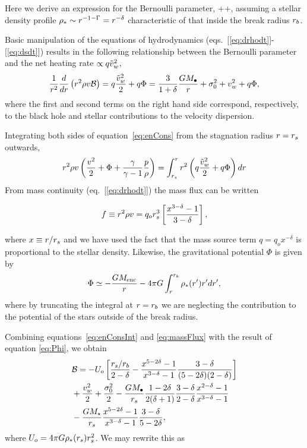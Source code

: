 Here we derive an expression for the Bernoulli parameter, \be
{} \equiv \ke +\gammaf {}+\Phi, \ee assuming a
stellar density profile $\rho_*\sim r^{-1-\Gamma}=r^{-\delta}$
characteristic of that inside the break radius $r_b$.

Basic manipulation of the equations of hydrodynamics
(eqs.~[\ref{eq:drhodt}]-[\ref{eq:dsdt}]) results in the following
relationship between the Bernoulli parameter and the net heating rate
$\propto q \tilde{v}_{w}^{2}$,
\begin{align}
\frac{1}{r^2} \frac{d}{dr} \left(r^2 \rho v \mathcal{B} \right) = q \frac{\tilde{v}_{w}^2}{2} + q \Phi = \frac{3}{1+\delta}\frac{G
  M_{\bullet}}{r}+\sigma_0^2+v_w^2 + q \Phi,
\label{eq:enCons}
\end{align}
where the first and second terms on the right hand side correspond,
respectively, to the black hole and stellar contributions to the
velocity dispersion.

Integrating both sides of equation~\eqref{eq:enCons} from the
stagnation radius $r = r_s$ outwards,
\begin{align}
  r^2 \rho v \left(\frac{v^2}{2}+\Phi+\frac{\gamma}{\gamma-1} \frac{p}{\rho} \right)= \int_{r_s}^{r}
    r^2 \left(q \frac{\tilde{v}_{w}^2}{2} + q\Phi\right) dr
    \label{eq:enConsInt}
\end{align}
From mass continuity (eq.~[\ref{eq:drhodt}]) the mass flux can be
written

\begin{equation}
 f\equiv r^2 \rho v = q_o r_s^3 \left[\frac{x^{3-\delta}-1}{3-\delta}\right],
 \label{eq:massFlux}
 \end{equation}

where $x \equiv r/r_s$ and we have used the fact that the mass
 source term $q = q_o x^{-\delta}$ is proportional to the stellar
 density.  Likewise, the gravitational potential $\Phi$ is given by
\begin{align}
\Phi \simeq -\frac{G M_{\rm enc}}{r} -4 \pi G \int_{r}^{r_b} \rho_*(r') r' dr',
\label{eq:Phi}
\end{align}
where by truncating the integral at $r = r_b$ we are neglecting the
contribution to the potential of the stars outside of the break
radius.

Combining equations~\eqref{eq:enConsInt} and \eqref{eq:massFlux} with
the result of equation \eqref{eq:Phi}, we obtain
\begin{align}
  &\mathcal{B} = -U_o\left[\frac{r_s/r_b}{2-\delta}-\frac{x^{5-2\delta}-1}{x^{3-\delta}-1}\frac{3-\delta}{(5-2\delta)(2-\delta)}\right]\nonumber\\
  &+\frac{v_w^2}{2}+\frac{\sigma_0^2}{2}- \frac{G M_{\bullet}}{r_s}
  \frac{1-2\delta}{2(\delta+1)}
  \frac{3-\delta}{2-\delta}\frac{x^{2-\delta}-1}{x^{3-\delta}-1}
  \nonumber\\
  &-\frac{G M_\star}{r_s}
  \frac{x^{5-2\delta}-1}{x^{3-\delta}-1}\frac{3-\delta}{5-2\delta},
\end{align}
where $U_o=4 \pi G \rho_*(r_s) r_s^2$.  We may rewrite this as 


